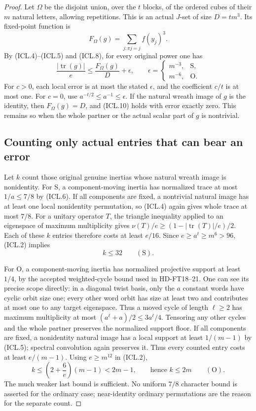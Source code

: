 \begin{proof}
Let $\Omega$ be the disjoint union, over the $t$ blocks, of the
ordered cubes of their $m$ natural letters, allowing repetitions.
This is an actual $J$-set of size $D=tm^3$.  Its fixed-point
function is
\[
             F_\Omega(g)=\sum_{j:\pi j=j}f(y_j)^3.
 \tag{ICL.9}
\]
By (ICL.4)--(ICL.5) and (ICL.8), for every original power one has
\[
 \frac{|\operatorname{tr}(g)|}{e}
 \le\frac{F_\Omega(g)}D+\epsilon,
 \qquad
 \epsilon=\begin{cases}m^{-3},&\mathrm S,\\m^{-6},&\mathrm O.
 \end{cases}
 \tag{ICL.10}
\]
For $c>0$, each local error is at most the stated $\epsilon$,
and the coefficient $c/t$ is at most one.  For $c=0$, use
$a^{-t/2}\le a^{-1}\le\epsilon$.
If the natural wreath image of $g$ is the identity, then
$F_\Omega(g)=D$, and (ICL.10) holds with error exactly zero.
This remains so when the whole partner or the actual scalar
part of $g$ is nontrivial.

\subsection*{Counting only actual entries that can bear an error}

Let $k$ count those original genuine inertias whose natural
wreath image is nonidentity.  For S, a component-moving inertia
has normalized trace at most $1/a\le7/8$ by (ICL.6).
If all components are fixed, a nontrivial natural image has at
least one local nonidentity permutation, so (ICL.4) again gives
whole trace at most $7/8$.
For a unitary operator $T$, the triangle inequality applied to
an eigenspace of maximum multiplicity gives
$\nu(T)/e\ge(1-|\operatorname{tr}(T)|/e)/2$.
Each of these $k$ entries therefore costs at least $e/16$.
Since $e\ge a^t\ge m^6>96$, (ICL.2) implies
\[
                         k\le32\qquad(\mathrm S).
 \tag{ICL.11}
\]

For O, a component-moving inertia has normalized projective
support at least $1/4$, by the accepted weighted-cycle bound
used in HD-FT18--21.  One can see its precise scope directly:
in a diagonal twist basis, only the $a$ constant words have
cyclic orbit size one; every other word orbit has size at least
two and contributes at most one to any target eigenspace.
Thus a moved cycle of length $\ell\ge2$ has maximum multiplicity
at most $(a^\ell+a)/2\le3a^\ell/4$.
Tensoring any other cycles and the whole partner preserves the
normalized support floor.  If all components are fixed, a
nonidentity natural image has a local support at least
$1/(m-1)$ by (ICL.5); spectral convolution again preserves it.
Thus every counted entry costs at least $e/(m-1)$.
Using $e\ge m^{12}$ in (ICL.2),
\[
 k\le\left(2+\frac6e\right)(m-1)<2m-1,
 \qquad\text{hence }k\le2m\qquad(\mathrm O).
 \tag{ICL.12}
\]
The much weaker last bound is sufficient.  No uniform $7/8$
character bound is asserted for the ordinary case; near-identity
ordinary permutations are the reason for the separate count.


\end{proof}
